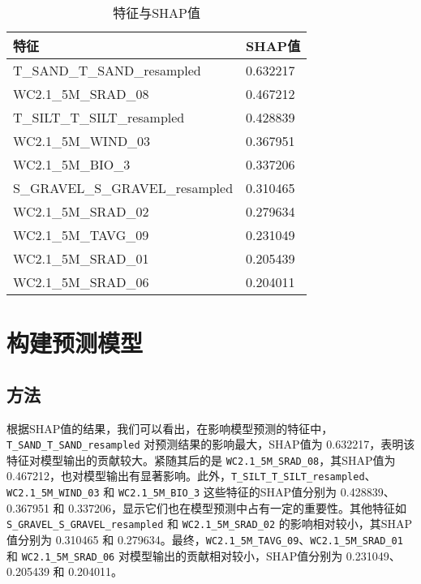 \documentclass[AutoFakeBold]{LZUThesis-PgD&PhD}
\begin{document}
\begin{table}[H]
	\centering
	\begin{tabular}{|l|l|}
		\hline
		\textbf{特征}                         & \textbf{SHAP值} \\ \hline
		T\_SAND\_T\_SAND\_resampled            & 0.632217        \\ \hline
		WC2.1\_5M\_SRAD\_08                   & 0.467212        \\ \hline
		T\_SILT\_T\_SILT\_resampled            & 0.428839        \\ \hline
		WC2.1\_5M\_WIND\_03                   & 0.367951        \\ \hline
		WC2.1\_5M\_BIO\_3                      & 0.337206        \\ \hline
		S\_GRAVEL\_S\_GRAVEL\_resampled       & 0.310465        \\ \hline
		WC2.1\_5M\_SRAD\_02                   & 0.279634        \\ \hline
		WC2.1\_5M\_TAVG\_09                   & 0.231049        \\ \hline
		WC2.1\_5M\_SRAD\_01                   & 0.205439        \\ \hline
		WC2.1\_5M\_SRAD\_06                   & 0.204011        \\ \hline
	\end{tabular}
	\caption{特征与SHAP值}
	\label{tab:shap_values}
\end{table}



\section{构建预测模型}


\subsection{方法}
根据SHAP值的结果，我们可以看出，在影响模型预测的特征中，\texttt{\break T\_SAND\_T\_SAND\_resampled} 对预测结果的影响最大，SHAP值为 0.632217，表明该特征对模型输出的贡献较大。紧随其后的是 \texttt{WC2.1\_5M\_SRAD\_08}，其SHAP值为 0.467212，也对模型输出有显著影响。此外，\texttt{T\_SILT\_T\_SILT\_resampled}、\texttt{WC2.1\_5M\_WIND\_03} 和 \texttt{WC2.1\_5M\_BIO\_3} 这些特征的SHAP值分别为 0.428839、0.367951 和 0.337206，显示它们也在模型预测中占有一定的重要性。其他特征如 \texttt{S\_GRAVEL\_S\_GRAVEL\_resampled} 和 \texttt{WC2.1\_5M\_SRAD\_02} 的影响相对较小，其SHAP值分别为 0.310465 和 0.279634。最终，\texttt{WC2.1\_5M\_TAVG\_09}、\texttt{WC2.1\_5M\_SRAD\_01} 和 \texttt{WC2.1\_5M\_SRAD\_06} 对模型输出的贡献相对较小，SHAP值分别为 0.231049、0.205439 和 0.204011。
\end{document}
